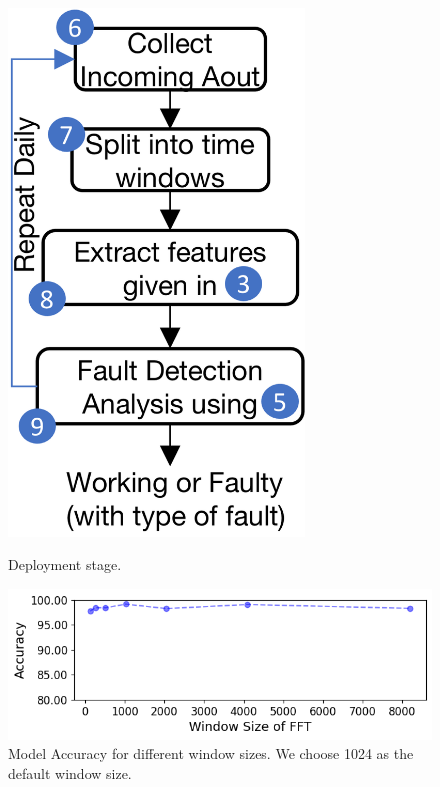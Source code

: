 \begin{figure}
\begin{minipage}[t]{0.22\textwidth}
		\includegraphics[width=0.7\textwidth]{figures/deployment/deployment-stage-5.png}
		\caption{\footnotesize{Deployment stage}.}
		\label{fig:deployment_steps}
	\end{minipage}
    \hfill
    \begin{minipage}[t]{0.5\textwidth}
        \centering
        \includegraphics[width=\textwidth]{figures/classification/accuracy_vs_window_size.png}
		\caption{\footnotesize{Model Accuracy} for different window sizes. We choose 1024 as the default window size.}
		\label{fig:accuracy_vs_window_size}
    \end{minipage}
\end{figure}

